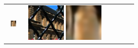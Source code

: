 \begin{figure}[ht!]
{\begin{tabular}{cccccc}
\begin{minipage}{0.180\textwidth}
            \includegraphics[width=0.46\textwidth, height=0.46\textwidth,cfbox=red 1pt 0pt]{img/qual/Palais_du_Luxembourg/LFT/SR.LAM.png}
        \end{minipage} &
        \begin{minipage}{0.180\textwidth}
            \centering
            \includegraphics[width=0.46\textwidth, height=0.46\textwidth,cfbox=blue 1pt 0pt]{img/qual/Palais_du_Luxembourg/EPIT/SR.png}
            \includegraphics[width=0.46\textwidth, height=0.46\textwidth,cfbox=red 1pt 0pt]{img/qual/Palais_du_Luxembourg/EPIT/SR.LAM.png}
        \end{minipage} &
        \begin{minipage}{0.180\textwidth}
            \centering

\end{minipage}
\end{tabular}}
\end{figure}
